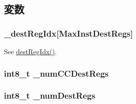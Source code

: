 \subsection{変数}
\hypertarget{classStaticInst_a157015ade233f4258d3fc3a4febb14f8}{
\subsubsection[{\_\-destRegIdx}]{ {\bf \_\-destRegIdx}\mbox{[}MaxInstDestRegs\mbox{]}}}
\label{classStaticInst_a157015ade233f4258d3fc3a4febb14f8}


See \hyperlink{classStaticInst_ae5a1a6d72f40f715253b91e32b3caad2}{destRegIdx()}. \hypertarget{classStaticInst_ae3670a4ffb2403a58b2d3ecc05cc5e38}{
\subsubsection[{\_\-numCCDestRegs}]{\setlength{\rightskip}{0pt plus 5cm}int8\_\-t {\bf \_\-numCCDestRegs}}}
\label{classStaticInst_ae3670a4ffb2403a58b2d3ecc05cc5e38}
\hypertarget{classStaticInst_ad6de38545e1fa5e1883b18cc0c69f891}{
\subsubsection[{\_\-numDestRegs}]{\setlength{\rightskip}{0pt plus 5cm}int8\_\-t {\bf \_\-numDestRegs}}}
\label{classStaticInst_ad6de38545e1fa5e1883b18cc0c69f891}


